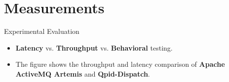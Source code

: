 \documentclass[hyperref={pdfpagelabels=false, unicode},pdf,slideColor,fyma,9pt]{beamer}
\begin{document}
    \section{Measurements}
    \begin{frame}{Experimental Evaluation}
      \begin{itemize}
          \setlength\itemsep{0.5em}
          \item \textbf{Latency} vs. \textbf{Throughput} vs. \textbf{Behavioral} testing.
          \item The figure shows the throughput and latency comparison of \textbf{Apache ActiveMQ Artemis} and \textbf{Qpid-Dispatch}.
      \end{itemize}
      \begin{figure}[ht]
        \begin{center}
        \end{center}
      \end{figure}
    \end{frame}
\end{document}
